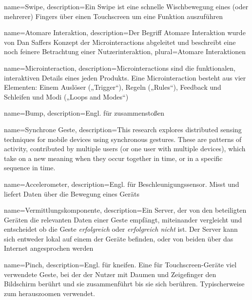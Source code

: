 {
    name=Swipe,
    description={Ein Swipe ist eine schnelle Wischbewegung eines (oder 				mehrerer) Fingers über einen Touchscreen um eine Funktion auszuführen}
}

{
    name=Atomare Interaktion,
    description={Der Begriff Atomare Interaktion wurde von Dan Saffers Konzept 		der Microinteractions abgeleitet und beschreibt eine noch feinere 				Betrachtung einer Nutzerinteraktion},
    plural={Atomare Interaktionen}
}

{
    name=Microinteraction,
    description={Microinteractions sind die funktionalen, interaktiven Details 		eines jeden Produkts. Eine Microinteraction besteht aus vier Elementen: 		Einem Auslöser („Trigger“), Regeln („Rules“), Feedback und Schleifen und 		Modi („Loops and Modes“)}
}

{
	name=Bump,
	description={Engl. für zusammenstoßen}
}

{
	name=Synchrone Geste,
	description={This research explores distributed sensing techniques for mobile devices  using synchronous gestures. These are patterns of activity, contributed by multiple users (or  one user with multiple devices), which take on a new meaning when they occur together in time, or in a specific sequence in time.}
}

{
	name=Accelerometer,
	description={Engl. für Beschleunigungssensor. Misst und liefert Daten 			über die Bewegung eines Geräts}
}

{
	name=Vermittlungskomponente,
	description={Ein Server, der von den beteiligten Geräten die relevanten 		Daten einer Geste empfängt, miteinander vergleicht und entscheidet ob die 	Geste \textit{erfolgreich} oder \textit{erfolgreich nicht} ist. Der 			Server kann sich entweder lokal auf einem der Geräte befinden, oder von 		beiden über das Internet angesprochen werden}
}

{
	name=Pinch,
	description={Engl. für kneifen. Eine für Touchscreen-Geräte viel 				verwendete Geste, bei der der Nutzer mit Daumen und Zeigefinger den 			Bildschirm berührt und sie zusammenführt bis sie sich berühren. 				Typischerweise zum herauszoomen verwendet.}
}